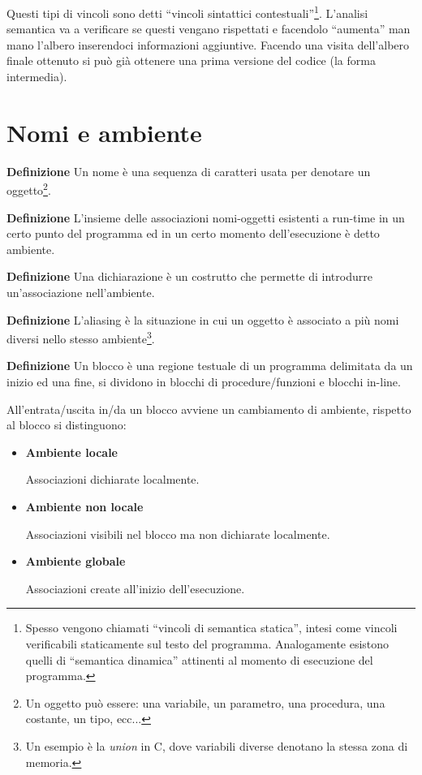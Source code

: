 \documentclass{article}
\newcommand{\df}{\noindent\textbf{Definizione} }
\begin{document}
Questi tipi di vincoli sono detti ``vincoli sintattici contestuali''\footnote{Spesso vengono chiamati ``vincoli di semantica statica'', intesi come vincoli verificabili staticamente sul testo del
programma. Analogamente esistono quelli di ``semantica dinamica'' attinenti al momento di esecuzione del programma.}. L'analisi semantica va a verificare se questi vengano rispettati e facendolo ``aumenta'' man mano l'albero inserendoci informazioni aggiuntive. Facendo una visita dell'albero finale ottenuto si può già ottenere una prima versione del codice (la forma intermedia).

\newpage

\section{Nomi e ambiente}

\df Un nome è una sequenza di caratteri usata per denotare un oggetto\footnote{Un oggetto può essere: una variabile, un parametro, una procedura, una costante, un tipo, ecc...}.\newline

\df L'insieme delle associazioni nomi-oggetti esistenti a run-time in un certo punto del programma ed in un certo momento dell'esecuzione è detto ambiente.\newline

\df Una dichiarazione è un costrutto che permette di introdurre un'associazione nell'ambiente.\newline

\df L'aliasing è la situazione in cui un oggetto è associato a più nomi diversi nello stesso ambiente\footnote{Un esempio è la \textit{union} in C, dove variabili diverse denotano la stessa zona di memoria.}.\newline

\df Un blocco è una regione testuale di un programma delimitata da un inizio ed una fine, si dividono in blocchi di procedure/funzioni e blocchi in-line.\newline

All'entrata/uscita in/da un blocco avviene un cambiamento di ambiente, rispetto al blocco si distinguono:
\begin{itemize}
    \item \textbf{Ambiente locale}
    
        Associazioni dichiarate localmente.
    
    \item \textbf{Ambiente non locale}
    
        Associazioni visibili nel blocco ma non dichiarate localmente.
    
    \item \textbf{Ambiente globale}
    
        Associazioni create all'inizio dell'esecuzione.
    
\end{itemize}
\end{document}
